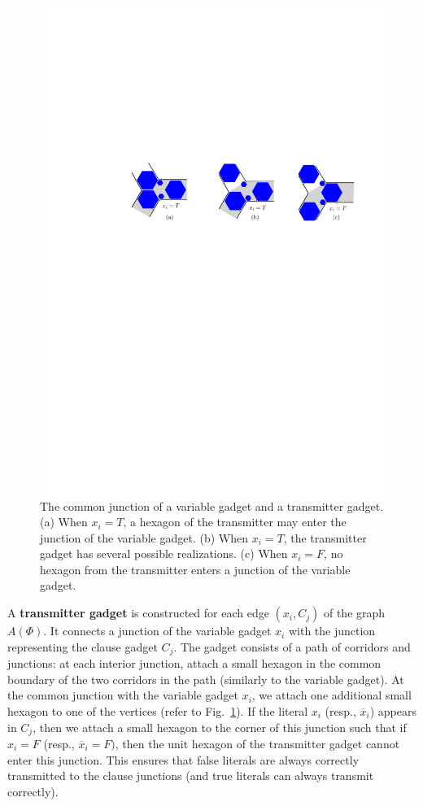 \documentclass[runningheads]{article}
\begin{document}
\begin{figure}[htbp]
	\centering
	\includegraphics[width=0.7\columnwidth]{fig-transmitter-hex}
	\caption{The common junction of a variable gadget and a transmitter gadget.
(a) When $x_i=T$, a hexagon of the transmitter may enter the junction of the variable gadget.
(b) When $x_i=T$, the transmitter gadget has several possible realizations.
(c) When $x_i=F$, no hexagon from the transmitter enters a junction of the variable gadget.}
	\label{fig:transmitter}
\end{figure}

A {\bf transmitter gadget} is constructed for each edge $(x_i,C_j)$ of the graph $A(\Phi)$.
It connects a junction of the variable gadget $x_i$ with the junction representing the clause gadget $C_j$. The gadget consists of a path of corridors and junctions: at each interior junction, attach a small hexagon in the common boundary of the two corridors in the path (similarly to the variable gadget). At the common junction with the variable gadget $x_i$, we attach one additional small hexagon to one of the vertices (refer to Fig.~\ref{fig:transmitter}). If the literal $x_i$ (resp., $\overline{x}_i$) appears in $C_j$, then we attach a small hexagon to the corner of this junction such that if $x_i=F$ (resp., $\overline{x}_i=F)$, then the unit hexagon of the transmitter gadget cannot enter this junction. This ensures that false literals are always correctly transmitted to the clause junctions (and true literals can always transmit correctly).
\end{document}
